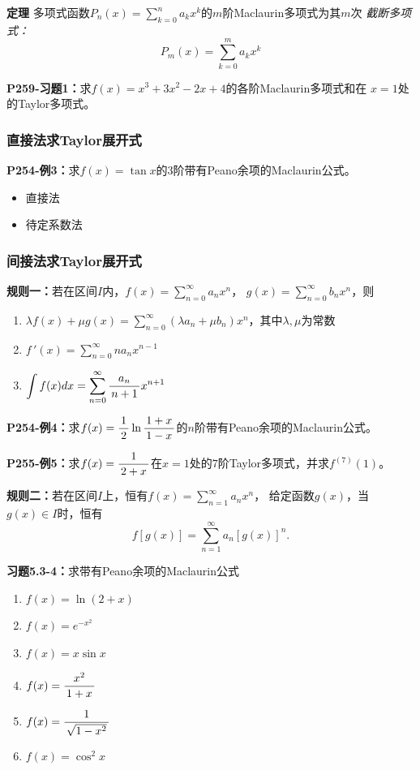 {\bf 定理}
多项式函数$P_n(x)=\sum\limits_{k=0}^na_kx^k$的$m$阶Maclaurin多项式为其$m$次
{\it 截断多项式：} 
$${P_m(x)=\sum\limits_{k=0}^ma_kx^k}$$

{\bf P259-习题1：}求$f(x)=x^3+3x^2-2x+4$的各阶Maclaurin多项式和在
$x=1$处的Taylor多项式。

\subsubsection{直接法求Taylor展开式}

{\bf P254-例3：}求$f(x)=\tan x$的$3$阶带有Peano余项的Maclaurin公式。

\begin{itemize}
  \setlength{\itemindent}{1cm}
  \item 直接法 
  \item 待定系数法
\end{itemize}

\subsubsection{间接法求Taylor展开式}

{\bf 规则一：}若在区间$I$内，$f(x)=\sum\limits_{n=0}^{\infty}a_nx^n$，
$g(x)=\sum\limits_{n=0}^{\infty}b_nx^n$，则
\begin{enumerate}[(1)]
  \setlength{\itemindent}{1cm}
  \item $\lambda f(x)+\mu g(x)=\sum\limits_{n=0}^{\infty}(\lambda a_n+\mu
  b_n)x^n$，其中$\lambda,\mu$为常数 
  \item $f\,'(x)=\sum\limits_{n=0}^{\infty}na_{n}x^{n-1}$ 
  \item $\displaystyle\int f(x)dx=\sum\limits_{n=0}^{\infty}
  \displaystyle\frac{\,{a_{n}}\,}{\,{n+1}\,}x^{n+1}$
\end{enumerate}

{\bf  P254-例4：}求$f(x)=\displaystyle\frac{\,{1}\,}{\,{2}\,}\ln\displaystyle\frac{\,{1+x}\,}{\,{1-x}\,}$的$n$阶带有Peano余项的Maclaurin公式。

{\bf P255-例5：}求$f(x)=\displaystyle\frac{\,{1}\,}{\,{2+x}\,}$在$x=1$处的$7$阶Taylor多项式，并求$f^{(7)}(1)$。

{\bf 规则二：}若在区间$I$上，恒有$f(x)=\sum\limits_{n=1}^{\infty}a_nx^n$，
给定函数$g(x)$，当$g(x)\in I$时，恒有
$$f[g(x)]=\sum\limits_{n=1}^{\infty}a_n[g(x)]^n.$$

{\bf 习题5.3-4：}求带有Peano余项的Maclaurin公式
\begin{enumerate}[(1)]
  \setlength{\itemindent}{1cm}
  \item $f(x)=\ln(2+x)$ 
  \item $f(x)=e^{-x^2}$
  \item $f(x)=x\sin x$ 
  \item $f(x)=\displaystyle\frac{\,{x^2}\,}{\,{1+x}\,}$ 
  \item $f(x)=\displaystyle\frac{\,{1}\,}{\,{\sqrt{1-x^2}}\,}$ 
  \item $f(x)=\cos^2x$
\end{enumerate}

